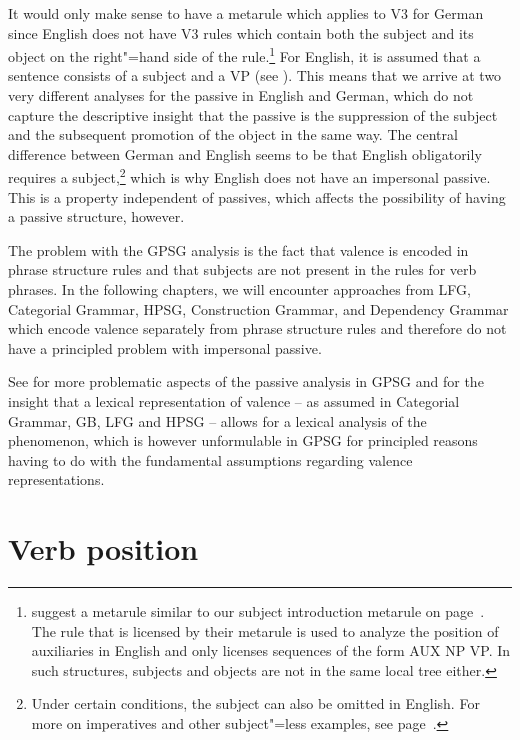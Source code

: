 It would only make sense to have a metarule which applies to V3 for German since English does not have V3 rules which contain both the subject
and its object on the right"=hand side of the rule.\footnote{%
 \citet[]{GKPS85a} suggest a metarule similar to our subject introduction metarule on page~\pageref{subjekt-meta}.
 The rule that is licensed by their metarule is used to analyze the position of auxiliaries in English and only licenses sequences of the form AUX NP VP. In such structures,
 subjects and objects are not in the same local tree either.
}
For English, it is assumed that a sentence consists of a subject and a VP (see \citealp[]{GKPS85a}). 
This means that we arrive at two very different analyses for the passive in English and German, which do not capture
the descriptive insight that the passive is the suppression of the subject and the subsequent
promotion of the object in the same way.
The central difference
between German and English seems to be that English obligatorily requires a subject,\footnote{%
  Under certain conditions, the subject can also be omitted in English. For more on imperatives and other subject"=less examples, see
  page~\pageref{Beispiel-Imperativ-Englisch}.
} which is why English does not have an impersonal passive. 
This is a property independent of passives, which affects the possibility of having a passive structure, however.

The problem with the GPSG analysis is the fact that valence is encoded in phrase structure rules and that subjects are not present in the rules
for verb phrases. In the following chapters, we will encounter approaches from LFG\indexlfg,
Categorial Grammar\indexcg, HPSG\indexhpsg, Construction Grammar\indexcxg, and Dependency Grammar\indexdg
which encode valence separately from phrase structure rules and therefore do not have a principled problem with impersonal passive.

See \citet[--396]{Jacobson87b} for more problematic aspects of the passive analysis in GPSG and for the insight that a lexical representation of valence -- as assumed
in Categorial Grammar, GB, LFG and HPSG -- allows for a lexical analysis of the phenomenon, which is however unformulable in GPSG for principled reasons having to
do with the fundamental assumptions regarding valence representations.

\section{Verb position}
\label{Abschnitt-Verbstellung-GPSG}

